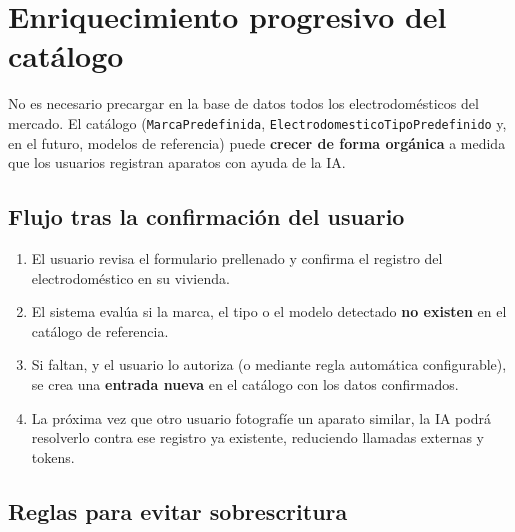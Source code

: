 \documentclass[11pt,a4paper]{article}
\begin{document}
\section{Enriquecimiento progresivo del catálogo}

No es necesario precargar en la base de datos todos los electrodomésticos del mercado. El catálogo (\texttt{MarcaPredefinida}, \texttt{ElectrodomesticoTipoPredefinido} y, en el futuro, modelos de referencia) puede \textbf{crecer de forma orgánica} a medida que los usuarios registran aparatos con ayuda de la IA.

\subsection{Flujo tras la confirmación del usuario}

\begin{enumerate}[leftmargin=*]
  \item El usuario revisa el formulario prellenado y confirma el registro del electrodoméstico en su vivienda.
  \item El sistema evalúa si la marca, el tipo o el modelo detectado \textbf{no existen} en el catálogo de referencia.
  \item Si faltan, y el usuario lo autoriza (o mediante regla automática configurable), se crea una \textbf{entrada nueva} en el catálogo con los datos confirmados.
  \item La próxima vez que otro usuario fotografíe un aparato similar, la IA podrá resolverlo contra ese registro ya existente, reduciendo llamadas externas y tokens.
\end{enumerate}

\subsection{Reglas para evitar sobrescritura}
\end{document}
